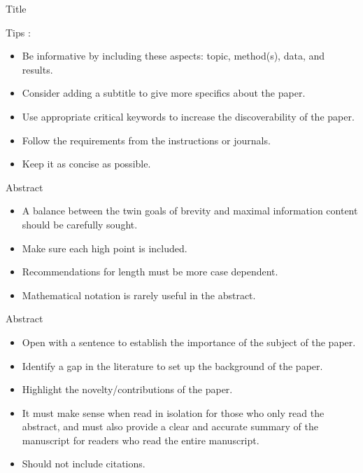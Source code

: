 \documentclass{beamer}
\begin{document}
    
    \begin{frame}{Title}
    
    Tips \citep{Yan2023}:
    \begin{itemize}
        \item Be informative by including these aspects: topic, method(s), data, and results.
        \item Consider adding a subtitle to give more specifics about the paper.
        \item Use appropriate critical keywords to increase the discoverability of the paper.
        \item Follow the requirements from the instructions or journals.
        \item Keep it as concise as possible.
    \end{itemize}
    
    \end{frame}
    
    
    \begin{frame}{Abstract}
    \begin{itemize}
        \item A balance between the twin goals of brevity and maximal information content should be carefully sought.
        \item Make sure each high point is included.
        \item Recommendations for length must be more case dependent.
        \item Mathematical notation is rarely useful in the abstract.
    \end{itemize}
    \end{frame}
    
    
    \begin{frame}{Abstract}
    \begin{itemize}
        \item Open with a sentence to establish the importance of the subject of the paper.
        \item Identify a gap in the literature to set up the background of the paper.
        \item Highlight the novelty/contributions of the paper.
        \item It must make sense when read in isolation for those who only read the abstract, and must also provide a clear and accurate summary of the manuscript for readers who read the entire manuscript.
        \item Should not include citations.
    \end{itemize}
    \end{frame}
    
\end{document}
